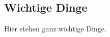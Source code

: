 \documentclass[doktyp=marbeit,fontsize=12pt,sprache=english,hausschrift=true,fleqn]{TUBAFarbeiten}
\begin{document}
\begin{appendix}
    \renewcommand*{\thepage}{\thesection\arabic{page}}
    \renewcommand{\thetable}{\thesection\arabic{table}}
    \renewcommand{\thefigure}{\thesection\arabic{figure}}

    \newpage

    \section{Wichtige Dinge}

    Hier stehen ganz wichtige Dinge.

    \newpage

    
    

    \newpage
    \listoftables

    \newpage
    \listoffigures

    \newpage
\end{appendix}
\end{document}
